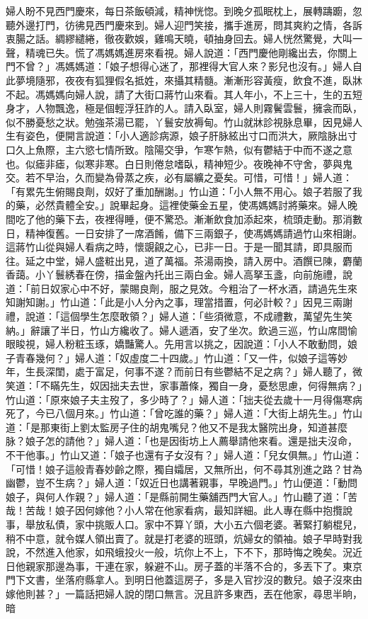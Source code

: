 \begin{showcontents}{}
婦人盼不見西門慶來，每日茶飯頓減，精神恍惚。到晚夕孤眠枕上，展轉躊躕，忽聽外邊打門，彷彿見西門慶來到。婦人迎門笑接，攜手進房，問其爽約之情，各訴衷腸之話。綢繆繾綣，徹夜歡娛，雞鳴天曉，頓抽身回去。婦人恍然驚覺，大叫一聲，精魂已失。慌了馮媽媽進房來看視。婦人說道：「西門慶他剛纔出去，你關上門不曾？」馮媽媽道：「娘子想得心迷了，那裡得大官人來？影兒也沒有。」婦人自此夢境隨邪，夜夜有狐狸假名抵姓，來攝其精髓。漸漸形容黃瘦，飲食不進，臥牀不起。馮媽媽向婦人說，請了大街口蔣竹山來看。其人年小，不上三十，生的五短身才，人物飄逸，極是個輕浮狂詐的人。請入臥室，婦人則霧鬢雲鬟，擁衾而臥，似不勝憂愁之狀。勉強茶湯已罷，丫鬟安放褥甸。竹山就牀診視脉息畢，因見婦人生有姿色，便開言說道：「小人適診病源，娘子肝脉絃出寸口而洪大，厥陰脉出寸口久上魚際，主六慾七情所致。陰陽交爭，乍寒乍熱，似有鬱結于中而不遂之意也。似瘧非瘧，似寒非寒。白日則倦怠嗜臥，精神短少。夜晚神不守舍，夢與鬼交。若不早治，久而變為骨蒸之疾，必有屬纊之憂矣。可惜，可惜！」婦人道：「有累先生俯賜良劑，奴好了重加酬謝。」竹山道：「小人無不用心。娘子若服了我的藥，必然貴體全安。」說畢起身。這裡使藥金五星，使馮媽媽討將藥來。婦人晚間吃了他的藥下去，夜裡得睡，便不驚恐。漸漸飲食加添起來，梳頭走動。那消數日，精神復舊。一日安排了一席酒餚，備下三兩銀子，使馮媽媽請過竹山來相謝。這蔣竹山從與婦人看病之時，懷覬覦之心，已非一日。于是一聞其請，即具服而往。延之中堂，婦人盛粧出見，道了萬福。茶湯兩換，請入房中。酒饌已陳，麝蘭香藹。小丫鬟綉春在傍，描金盤內托出三兩白金。婦人高拏玉盞，向前施禮，說道：「前日奴家心中不好，蒙賜良劑，服之見效。今粗治了一杯水酒，請過先生來知謝知謝。」竹山道：「此是小人分內之事，理當措置，何必計較？」因見三兩謝禮，說道：「這個學生怎麼敢領？」婦人道：「些須微意，不成禮數，萬望先生笑納。」辭讓了半日，竹山方纔收了。婦人遞酒，安了坐次。飲過三巡，竹山席間愉眼睃視，婦人粉粧玉琢，嬌豔驚人。先用言以挑之，因說道：「小人不敢動問，娘子青春幾何？」婦人道：「奴虛度二十四歲。」竹山道：「又一件，似娘子這等妙年，生長深閨，處于富足，何事不遂？而前日有些鬱結不足之病？」婦人聽了，微笑道：「不瞞先生，奴因拙夫去世，家事蕭條，獨自一身，憂愁思慮，何得無病？」竹山道：「原來娘子夫主歿了，多少時了？」婦人道：「拙夫從去歲十一月得傷寒病死了，今已八個月來。」竹山道：「曾吃誰的藥？」婦人道：「大街上胡先生。」竹山道：「是那東街上劉太監房子住的胡鬼嘴兒？他又不是我太醫院出身，知道甚麼脉？娘子怎的請他？」婦人道：「也是因街坊上人薦舉請他來看。還是拙夫沒命，不干他事。」竹山又道：「娘子也還有子女沒有？」婦人道：「兒女俱無。」竹山道：「可惜！娘子這般青春妙齡之際，獨自孀居，又無所出，何不尋其別進之路？甘為幽鬱，豈不生病？」婦人道：「奴近日也講著親事，早晚過門。」竹山便道：「動問娘子，與何人作親？」婦人道：「是縣前開生藥舖西門大官人。」竹山聽了道：「苦哉！苦哉！娘子因何嫁他？小人常在他家看病，最知詳細。此人專在縣中抱攬說事，舉放私債，家中挑販人口。家中不算丫頭，大小五六個老婆。著緊打躺棍兒，稍不中意，就令媒人領出賣了。就是打老婆的班頭，炕婦女的領袖。娘子早時對我說，不然進入他家，如飛蛾投火一般，坑你上不上，下不下，那時悔之晚矣。況近日他親家那邊為事，干連在家，躲避不山。房子蓋的半落不合的，多丟下了。東京門下文書，坐落府縣拿人。到明日他蓋這房子，多是入官抄沒的數兒。娘子沒來由嫁他則甚？」一篇話把婦人說的閉口無言。況且許多東西，丟在他家，尋思半晌，暗
\end{showcontents}
